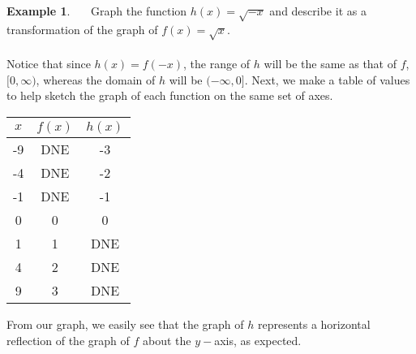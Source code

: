 \documentclass[11pt]{book}
\theoremstyle{definition}  %
\newtheorem{example}{Example}[chapter]
\begin{document}
\begin{example}~~~Graph the function $h(x)=\sqrt{-x}$ and describe it as a transformation of the graph of $f(x)=\sqrt{x}$.\\
~\\
Notice that since $h(x)=f(-x)$, the range of $h$ will be the same as that of $f$, $[0,\infty)$, whereas the domain of $h$ will be $(-\infty,0]$.  Next, we make a table of values to help sketch the graph of each function on the same set of axes.

\begin{center}
\begin{tabular}{c||c|c}
$x$ & $f(x)$ &  $h(x)$ \\
\hline
-9 & DNE &  -3 \\
-4 & DNE &  -2 \\
-1 & DNE &  -1 \\
0 & 0 &  0 \\
1 & 1 &  DNE \\
4 & 2 &  DNE \\
9 & 3 &  DNE \\
\end{tabular}
\end{center}

\begin{center}
\end{center}

From our graph, we easily see that the graph of $h$ represents a horizontal reflection of the graph of $f$ about the $y-$axis, as expected.
\end{example}
\end{document}
